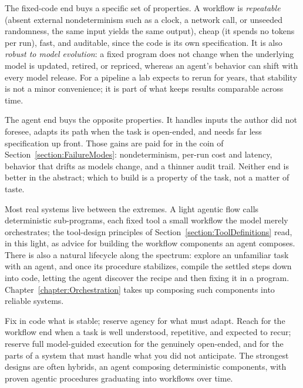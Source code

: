 The fixed-code end buys a specific set of properties.
A workflow is \emph{repeatable} (absent external nondeterminism such as a clock, a network call, or unseeded randomness, the same input yields the same output), cheap (it spends no tokens per run), fast, and auditable, since the code is its own specification.
It is also \emph{robust to model evolution}: a fixed program does not change when the underlying model is updated, retired, or repriced, whereas an agent's behavior can shift with every model release.
For a pipeline a lab expects to rerun for years, that stability is not a minor convenience; it is part of what keeps results comparable across time.

The agent end buys the opposite properties.
It handles inputs the author did not foresee, adapts its path when the task is open-ended, and needs far less specification up front.
Those gains are paid for in the coin of Section~\ref{section:FailureModes}: nondeterminism, per-run cost and latency, behavior that drifts as models change, and a thinner audit trail.
Neither end is better in the abstract; which to build is a property of the task, not a matter of taste.

Most real systems live between the extremes.
A light agentic flow calls deterministic sub-programs, each fixed tool a small workflow the model merely orchestrates; the tool-design principles of Section~\ref{section:ToolDefinitions} read, in this light, as advice for building the workflow components an agent composes.
There is also a natural lifecycle along the spectrum: explore an unfamiliar task with an agent, and once its procedure stabilizes, compile the settled steps down into code, letting the agent discover the recipe and then fixing it in a program.
Chapter~\ref{chapter:Orchestration} takes up composing such components into reliable systems.

\begin{principle}
\label{principle:FixWhatIsStable}
Fix in code what is stable; reserve agency for what must adapt.
Reach for the workflow end when a task is well understood, repetitive, and expected to recur; reserve full model-guided execution for the genuinely open-ended, and for the parts of a system that must handle what you did not anticipate.
The strongest designs are often hybrids, an agent composing deterministic components, with proven agentic procedures graduating into workflows over time.
\end{principle}

